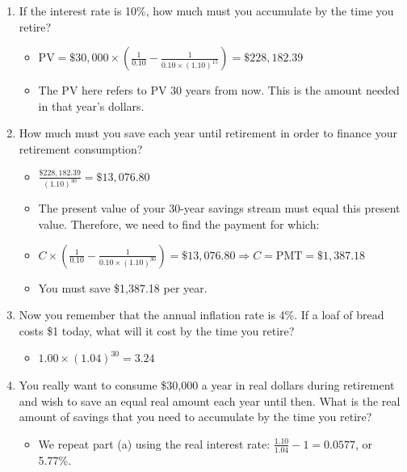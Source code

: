 \documentclass[10pt,landscape]{article}
\begin{document}
\begin{multicols*}{3}
\begin{enumerate}[label=(\alph*),topsep=0pt,noitemsep,wide=0pt, leftmargin=\dimexpr\labelwidth + 2\labelsep\relax]
    \item If the interest rate is 10\%, how much must you accumulate by the time you retire?
    \begin{itemize}[topsep=0pt,noitemsep,wide=0pt, leftmargin=\dimexpr{} + 2\relax]
        \item $\text{PV} = \$30,000 \times \left( \frac{1}{0.10} - \frac{1}{0.10 \times (1.10)^{15}} \right) = \$228,182.39$
        \item The PV here refers to PV 30 years from now. This is the amount needed in that year’s dollars.
    \end{itemize}
    \item How much must you save each year until retirement in order to finance your retirement consumption?
    \begin{itemize}[topsep=0pt,noitemsep,wide=0pt, leftmargin=\dimexpr{} + 2\relax]
        \item $\frac{\$228,182.39}{(1.10)^{30}} = \$13,076.80$
        \item The present value of your 30-year savings stream must equal this present value. Therefore, we need to find the payment for which:
        \item $C \times \left( \frac{1}{0.10} - \frac{1}{0.10 \times (1.10)^{30}} \right) = \$13,076.80 \Rightarrow C = \text{PMT} = \$1,387.18$
        \item You must save \$1,387.18 per year.
    \end{itemize}
    \item Now you remember that the annual inflation rate is 4\%. If a loaf of bread costs \$1 today, what will it cost by the time you retire?
    \begin{itemize}[topsep=0pt,noitemsep,wide=0pt, leftmargin=\dimexpr{} + 2\relax]
        \item $1.00 \times (1.04)^{30} = 3.24$
    \end{itemize}
    \item You really want to consume \$30,000 a year in real dollars during retirement and wish to save an equal real amount each year until then. What is the real amount of savings that you need to accumulate by the time you retire?
    \begin{itemize}[topsep=0pt,noitemsep,wide=0pt, leftmargin=\dimexpr{} + 2\relax]
        \item We repeat part (a) using the real interest rate: \(\frac{1.10}{1.04} - 1 = 0.0577\), or 5.77\%.

\end{itemize}
\end{enumerate}
\end{multicols*}
\end{document}
